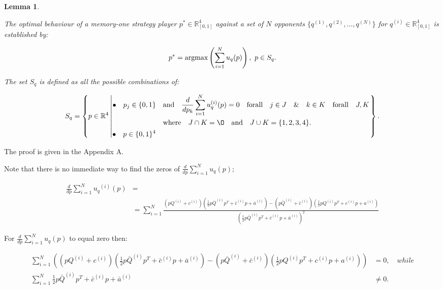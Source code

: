 \documentclass[10pt]{article}
\newcommand{\R}{\mathbb{R}}
\newtheorem{lemma}[theorem]{Lemma}
\begin{document}
\begin{lemma}\label{lemma:memone_group_best_response}

    The optimal behaviour of a memory-one strategy player
    \(p^* \in \R_{[0, 1]} ^ 4\)
    against a set of \(N\) opponents \(\{q^{(1)}, q^{(2)}, \dots, q^{(N)} \}\)
    for \(q^{(i)} \in \R_{[0, 1]} ^ 4\) is established by:

    \[p^* = \textnormal{argmax}\left(\sum\limits_{i=1} ^ N  u_q(p)\right), \ p \in S_q.\]

    The set \(S_q\) is defined as all the possible combinations of:

    \[
        S_q =
        \left\{p \in \mathbb{R} ^ 4 \left|
            \begin{aligned}
                \bullet\quad p_j \in \{0, 1\} & \quad \text{and} \quad \frac{d}{dp_k} 
                \sum\limits_{i=1} ^ N  u_q^{(i)}(p) = 0
                \quad \text{forall} \quad j \in J \quad \&  \quad k \in K  \quad \text{forall} \quad J, K \\
                & \quad \text{where} \quad J \cap K = \O \quad
                \text{and} \quad J \cup K = \{1, 2, 3, 4\}.\\
                \bullet\quad  p \in \{0, 1\} ^ 4
            \end{aligned}\right.
        \right\}.
    \]
\end{lemma}

The proof is given in the Appendix A.

Note that there is no immediate way to find the zeros of \(\frac{d}{dp} \sum\limits_{i=1} ^ N  u_q(p)\);

{\small
\begin{align}\label{eq:mo_tournament_derivative}
    \frac{d}{dp} \sum\limits_{i=1} ^ {N} {u_q}^{(i)} (p) & = \nonumber \\
    & =  \displaystyle\sum\limits_{i=1} ^ {N}
    \frac{\left(pQ^{(i)} + c^{(i)}\right) \left(\frac{1}{2} p\bar{Q}^{(i)} p^T + \bar{c}^{(i)} p + \bar{a}^ {(i)}\right)
    - \left(p\bar{Q}^{(i)} + \bar{c}^{(i)}\right) \left(\frac{1}{2} pQ^{(i)} p^T + c^{(i)} p + a^ {(i)}\right)}
    {\left(\frac{1}{2} p\bar{Q}^{(i)} p^T + \bar{c}^{(i)} p + \bar{a}^ {(i)}\right)^ 2}
\end{align}
}

For \(\frac{d}{dp} \sum\limits_{i=1} ^ N  u_q(p)\) to equal zero then:

{\scriptsize
\begin{align}\label{eq:polynomials_roots}
    \displaystyle\sum\limits_{i=1} ^ {N} \left(
    \left(pQ^{(i)} + c^{(i)}\right) \left(\frac{1}{2} p\bar{Q}^{(i)} p^T + \bar{c}^{(i)} p + \bar{a}^ {(i)}\right)
    - \left(p\bar{Q}^{(i)} + \bar{c}^{(i)}\right) \left(\frac{1}{2} pQ^{(i)} p^T + c^{(i)} p + a^ {(i)}\right)\right)
    &= 0, \quad {while} \\
    \displaystyle\sum\limits_{i=1} ^ {N} \frac{1}{2} p\bar{Q}^{(i)} p^T + \bar{c}^{(i)} p + \bar{a}^ {(i)} &\neq 0.
\end{align}}
\end{document}
